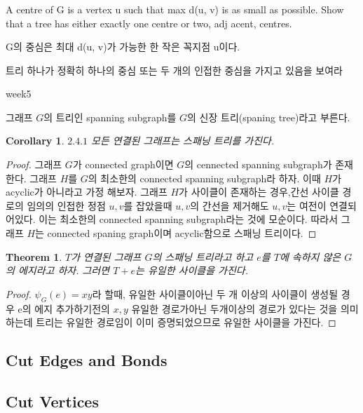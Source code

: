 \documentclass{oblivoir}
\newtheorem{theorem}{Theorem}[section]
\newtheorem{corollary}{Corollary}[theorem]
\begin{document}
\subsubsection{} 
A centre of G is a vertex u such that max d(u, v) is as small as possible.
Show that a tree has either exactly one centre or two,
adj acent, centres.


G의 중심은 최대 d(u, v)가 가능한 한 작은 꼭지점 u이다.

트리 하나가 정확히 하나의 중심 또는 두 개의 인접한 중심을 가지고 있음을 보여라

week5

\begin{dfn}
    그래프 $G$의 트리인 spanning subgraph를 $G$의 신장 트리(spaning tree)라고 부른다.
\end{dfn}

\begin{corollary}
    $2.4.1$ 모든 연결된 그래프는 스패닝 트리를 가진다.
\end{corollary}

\begin{proof}
    그래프 $G$가 connected graph이면 $G$의 cennected spanning subgraph가 존재한다.
    그래프 $H$를 $G$의 최소한의 connected spanning subgraph라 하자.
    이때 $H$가 acyclic가 아니라고 가정 해보자.
    그래프 $H$가 사이클이 존재하는 경우,간선 사이클 경로의 임의의 인접한 정점 $u, v$를 잡았을때 $u, v$의 간선을 제거해도 $u, v$는 여전이 연결되어있다. 이는 최소한의 connected spanning subgraph라는 것에 모순이다. 
    따라서 그래프 $H$는 connected spaning graph이며 acyclic함으로 스패닝 트리이다.
\end{proof}

\begin{theorem}
    $T$가 연결된 그래프 $G$의 스패닝 트리라고 하고 $e$를 $T$에 속하지 않은 $G$의 에지라고 하자. 그러면 $T + e$는 유일한 사이클을 가진다.
\end{theorem}
\begin{proof}
    $\psi_G(e) = xy$라 할때, 유일한 사이클이아닌 두 개 이상의 사이클이 생성될 경우  e의 에지 추가하기전의 $x, y$ 유일한 경로가아닌 두개이상의 경로가 있다는 것을 의미하는데 트리는 유일한 경로임이 이미 증명되었으므로 유일한 사이클을 가진다.
\end{proof}
\subsection{Cut Edges and Bonds}

\subsection{Cut Vertices}
\end{document}
